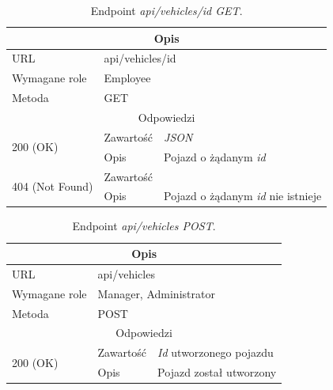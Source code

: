 \documentclass[eng,printmode,openany]{mgr}
\begin{document}
	\begin{table}[H]
		\caption{Endpoint \textit{api/vehicles/id GET}.}
		\begin{tabularx}{\textwidth}{|l|l|X|}
			\hline
			\multicolumn{3}{|c|}{Opis}
			\\ \hline
			URL                         & \multicolumn{2}{l|}{api/vehicles/id}
			\\ \hline
			Wymagane role               & \multicolumn{2}{l|}{Employee}
			\\ \hline
			Metoda                      & \multicolumn{2}{l|}{GET}
			\\ \hline
			\multicolumn{3}{|c|}{Odpowiedzi}
			\\ \hline
			\multirow{2}{*}{200 (OK)} 	        & Zawartość   	& \textit{JSON}
			\\ \cline{2-3}                      & Opis         	& Pojazd o żądanym \textit{id}
			\\ \hline
			\multirow{2}{*}{404 (Not Found)} 	& Zawartość     & 
			\\ \cline{2-3}                      & Opis          & Pojazd o żądanym \textit{id} nie istnieje
			\\ \hline
		\end{tabularx}
	\end{table}
	
	\begin{table}[H]
		\caption{Endpoint \textit{api/vehicles POST}.}
		\begin{tabularx}{\textwidth}{|l|l|X|}
			\hline
			\multicolumn{3}{|c|}{Opis}
			\\ \hline
			URL                       & \multicolumn{2}{l|}{api/vehicles}
			\\ \hline
			Wymagane role             & \multicolumn{2}{l|}{Manager, Administrator}
			\\ \hline
			Metoda                    & \multicolumn{2}{l|}{POST}
			\\ \hline
			\multicolumn{3}{|c|}{Odpowiedzi}
			\\ \hline
			\multirow{2}{*}{200 (OK)} 		& Zawartość     & \textit{Id} utworzonego pojazdu
			\\ \cline{2-3}                  & Opis         	& Pojazd został utworzony
			\\ \hline
		\end{tabularx}
	\end{table}
	
\end{document}

